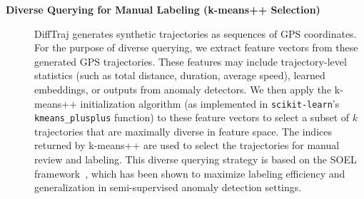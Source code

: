 \documentclass[runningheads]{llncs}
\begin{document}
\begin{description}
    \item[\textbf{Diverse Querying for Manual Labeling (k-means++ Selection)}] DiffTraj generates synthetic trajectories as sequences of GPS coordinates. For the purpose of diverse querying, we extract feature vectors from these generated GPS trajectories. These features may include trajectory-level statistics (such as total distance, duration, average speed), learned embeddings, or outputs from anomaly detectors. We then apply the k-means++ initialization algorithm (as implemented in \texttt{scikit-learn}'s \texttt{kmeans\_plusplus} function) to these feature vectors to select a subset of $k$ trajectories that are maximally diverse in feature space. The indices returned by k-means++ are used to select the trajectories for manual review and labeling. This diverse querying strategy is based on the SOEL framework~\cite{liDeepAnomalyDetection2023}, which has been shown to maximize labeling efficiency and generalization in semi-supervised anomaly detection settings.
    

\end{description}
\end{document}
